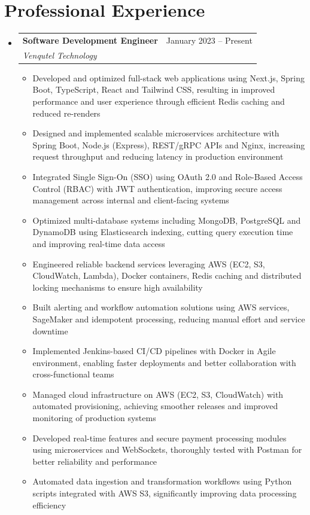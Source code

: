 \documentclass[letterpaper,11pt]{article}
\makeatletter
\newcommand{\resumeItem}[1]{
  \item\small{
    {#1 \vspace{-2pt}}
  }
}
\newcommand{\resumeSubheading}[4]{
  \vspace{-2pt}\item
    \begin{tabular*}{0.97\textwidth}[t]{l@{\extracolsep{\fill}}r}
      \textbf{#1} & #2 \\
      \textit{\small#3} & \textit{\small #4} \\
    \end{tabular*}\vspace{-7pt}
}
\newcommand{\resumeSubHeadingListStart}{\begin{itemize}[leftmargin=0.15in, label={}]}
\newcommand{\resumeSubHeadingListEnd}{\end{itemize}}
\newcommand{\resumeItemListStart}{\begin{itemize}}
\newcommand{\resumeItemListEnd}{\end{itemize}\vspace{-5pt}}
\makeatother
\begin{document}
\section{Professional Experience}
  \resumeSubHeadingListStart

    \resumeSubheading
      {Software Development Engineer}{January 2023 -- Present}
      {Venqutel Technology}{}
      \resumeItemListStart
        \resumeItem{Developed and optimized full-stack web applications using Next.js, Spring Boot, TypeScript, React and Tailwind CSS, resulting in improved performance and user experience through efficient Redis caching and reduced re-renders}
        \resumeItem{Designed and implemented scalable microservices architecture with Spring Boot, Node.js (Express), REST/gRPC APIs and Nginx, increasing request throughput and reducing latency in production environment}
        \resumeItem{Integrated Single Sign-On (SSO) using OAuth 2.0 and Role-Based Access Control (RBAC) with JWT authentication, improving secure access management across internal and client-facing systems}
        \resumeItem{Optimized multi-database systems including MongoDB, PostgreSQL and DynamoDB using Elasticsearch indexing, cutting query execution time and improving real-time data access}
        \resumeItem{Engineered reliable backend services leveraging AWS (EC2, S3, CloudWatch, Lambda), Docker containers, Redis caching and distributed locking mechanisms to ensure high availability}
        \resumeItem{Built alerting and workflow automation solutions using AWS services, SageMaker and idempotent processing, reducing manual effort and service downtime}
        \resumeItem{Implemented Jenkins-based CI/CD pipelines with Docker in Agile environment, enabling faster deployments and better collaboration with cross-functional teams}
        \resumeItem{Managed cloud infrastructure on AWS (EC2, S3, CloudWatch) with automated provisioning, achieving smoother releases and improved monitoring of production systems}
        \resumeItem{Developed real-time features and secure payment processing modules using microservices and WebSockets, thoroughly tested with Postman for better reliability and performance}
        \resumeItem{Automated data ingestion and transformation workflows using Python scripts integrated with AWS S3, significantly improving data processing efficiency}
      \resumeItemListEnd

  \resumeSubHeadingListEnd

\end{document}
